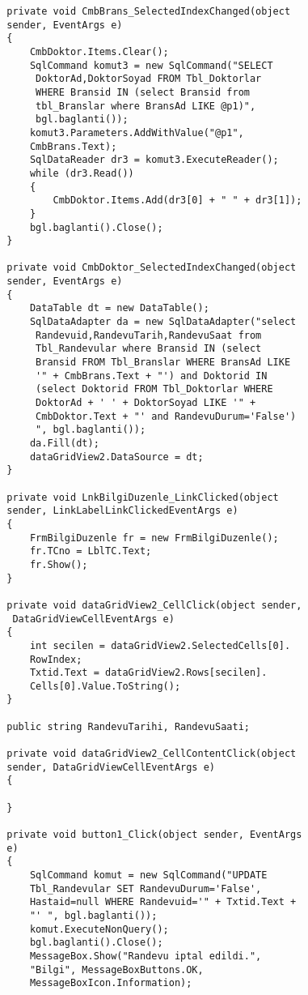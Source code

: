 \begin{lstlisting}
        private void CmbBrans_SelectedIndexChanged(object 
        sender, EventArgs e)
        {
            CmbDoktor.Items.Clear();
            SqlCommand komut3 = new SqlCommand("SELECT
             DoktorAd,DoktorSoyad FROM Tbl_Doktorlar 
             WHERE Bransid IN (select Bransid from 
             tbl_Branslar where BransAd LIKE @p1)", 
             bgl.baglanti());
            komut3.Parameters.AddWithValue("@p1", 
            CmbBrans.Text);
            SqlDataReader dr3 = komut3.ExecuteReader();
            while (dr3.Read())
            {
                CmbDoktor.Items.Add(dr3[0] + " " + dr3[1]);
            }
            bgl.baglanti().Close();
        }

        private void CmbDoktor_SelectedIndexChanged(object 
        sender, EventArgs e)
        {
            DataTable dt = new DataTable();
            SqlDataAdapter da = new SqlDataAdapter("select
             Randevuid,RandevuTarih,RandevuSaat from 
             Tbl_Randevular where Bransid IN (select 
             Bransid FROM Tbl_Branslar WHERE BransAd LIKE 
             '" + CmbBrans.Text + "') and Doktorid IN 
             (select Doktorid FROM Tbl_Doktorlar WHERE 
             DoktorAd + ' ' + DoktorSoyad LIKE '" + 
             CmbDoktor.Text + "' and RandevuDurum='False') 
             ", bgl.baglanti());
            da.Fill(dt);
            dataGridView2.DataSource = dt;
        }

        private void LnkBilgiDuzenle_LinkClicked(object 
        sender, LinkLabelLinkClickedEventArgs e)
        {
            FrmBilgiDuzenle fr = new FrmBilgiDuzenle();
            fr.TCno = LblTC.Text;
            fr.Show();
        }

        private void dataGridView2_CellClick(object sender,
         DataGridViewCellEventArgs e)
        {
            int secilen = dataGridView2.SelectedCells[0].
            RowIndex;
            Txtid.Text = dataGridView2.Rows[secilen].
            Cells[0].Value.ToString();
        }

        public string RandevuTarihi, RandevuSaati;

        private void dataGridView2_CellContentClick(object 
        sender, DataGridViewCellEventArgs e)
        {

        }

        private void button1_Click(object sender, EventArgs 
        e)
        {
            SqlCommand komut = new SqlCommand("UPDATE 
            Tbl_Randevular SET RandevuDurum='False', 
            Hastaid=null WHERE Randevuid='" + Txtid.Text + 
            "' ", bgl.baglanti());
            komut.ExecuteNonQuery();
            bgl.baglanti().Close();
            MessageBox.Show("Randevu iptal edildi.", 
            "Bilgi", MessageBoxButtons.OK, 
            MessageBoxIcon.Information);


\end{lstlisting}
